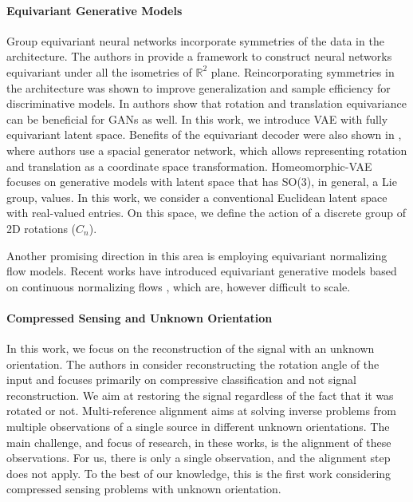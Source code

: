 \paragraph{Equivariant Generative Models}
Group equivariant neural networks \citep{cohen2016group} incorporate symmetries of the data in the architecture. The authors in \cite{e2cnn} provide a framework to construct neural networks equivariant under all the isometries of  $\mathbb{R}^2$ plane. Reincorporating symmetries in the architecture was shown to improve generalization and sample efficiency for discriminative models. In \cite{Karras2021-yx} authors show that rotation and translation equivariance can be beneficial for GANs as well.  In this work, we introduce VAE with fully equivariant latent space. Benefits of the equivariant decoder were also shown in \cite{Bepler2019-qi}, where authors use a spacial generator network, which allows representing rotation and translation as a coordinate space transformation. Homeomorphic-VAE \cite{falorsi2018explorations} focuses on generative models with latent space that has SO(3), in general, a Lie group, values. In this work, we consider a conventional Euclidean latent space with real-valued entries. On this space, we deﬁne the action of a discrete group of 2D rotations ($C_n$). 

Another promising direction in this area is employing equivariant normalizing flow models. Recent works have introduced equivariant generative models based on continuous normalizing flows  \cite{kohler2020equivariant, satorras2021n}, which are, however difficult to scale. 

\paragraph{Compressed Sensing and Unknown Orientation}
In this work, we focus on the reconstruction of the signal with an unknown orientation. The authors in \cite{davenport2007smashed} consider reconstructing the rotation angle of the input and focuses primarily on compressive classiﬁcation and not signal reconstruction. We aim at restoring the signal regardless of the fact that it was rotated or not. Multi-reference alignment \cite{bendory2017bispectrum} aims at solving inverse problems from multiple observations of a single source in different unknown orientations. The main challenge, and focus of research, in these works, is the alignment of these observations. For us, there is only a single observation, and the alignment step does not apply. To the best of our knowledge, this is the first work considering compressed sensing problems with unknown orientation. 


